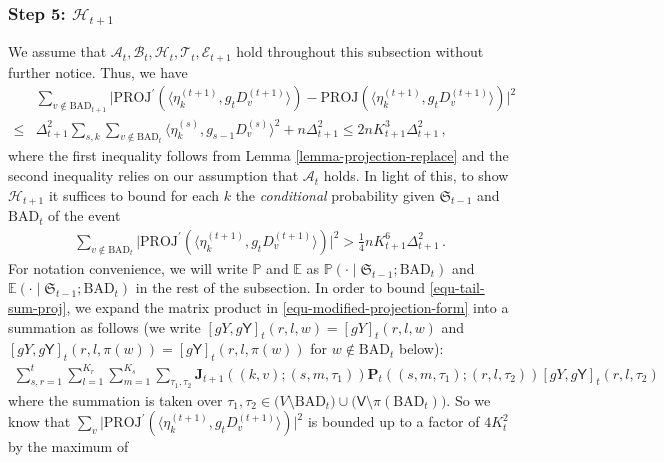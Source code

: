 \documentclass[11pt]{article}
\numberwithin{equation}{section}
\begin{document}
\subsubsection{Step 5: $\mathcal{H}_{t+1}$}
We assume that $\mathcal{A}_{t}, \mathcal{B}_{t}, \mathcal{H}_{t}, \mathcal{T}_t, \mathcal{E}_{t+1}$ hold throughout this subsection without further notice. Thus, we have
\begin{align*}
    & \sum_{v \not \in \mathrm{BAD}_{t+1}} \big| {\mathrm{PROJ}}^{\prime} (\langle \eta^{(t+1)}_k, g_t D^{(t+1)}_v \rangle) - \mathrm{PROJ}(\langle \eta^{(t+1)}_k, g_t D^{(t+1)}_v \rangle) \big|^2 \\
    \leq & \Delta_{t+1}^2 \sum_{s,k} \sum_{v \not \in \mathrm{BAD}_{t}} \langle \eta^{(s)}_k, g_{s-1} D^{(s)}_v \rangle^2 + n \Delta_{t+1}^2 \leq 2 n K_{t+1}^3 \Delta_{t+1}^2  \,,
\end{align*}
where the first inequality follows from Lemma \ref{lemma-projection-replace} and the second inequality relies on our assumption that $\mathcal{A}_t$ holds.
In light of this, to show $\mathcal{H}_{t+1}$ it suffices to bound for each $k$ the \emph{conditional} probability given $\mathfrak{S}_{t-1}$ and $\mathrm{BAD}_t$ of the event
\begin{align}
    \sum_{v \not \in \mathrm{BAD}_t} \big| {\mathrm{PROJ}}^{\prime} (\langle \eta^{(t+1)}_k, g_t D^{(t+1)}_v \rangle) \big|^2 > \frac{1}{4} n K_{t+1}^{6} \Delta_{t+1}^2\,.
    \label{equ-tail-sum-proj}
\end{align}
For notation  convenience, we will write $\mathbb P$ and $\mathbb E$ as $\mathbb P(\cdot \mid \mathfrak{S}_{t-1}; \mathrm{BAD}_t)$ and $\mathbb E(\cdot \mid \mathfrak{S}_{t-1}; \mathrm{BAD}_t)$ in the rest of the subsection. In order to bound \eqref{equ-tail-sum-proj}, we expand the matrix product in \eqref{equ-modified-projection-form} into a summation as follows (we write $[g Y,g\mathsf{Y}]_{t} (r,l,w) = [g Y]_{t} (r,l,w)$ and $[g Y,g\mathsf{Y}]_{t} (r,l,\pi(w)) = [g \mathsf{Y}]_{t} (r,l,\pi(w))$ for $w \not \in \mathrm{BAD}_t$ below):
\begin{equation}
\begin{aligned}
    \sum_{s,r=1}^{t} \sum_{l=1}^{K_r} \sum_{m=1}^{K_s} \sum_{\tau_1,\tau_2} \mathbf{J}_{t+1}( (k,v);(s,m,\tau_1) ) \mathbf{P}_t((s,m,\tau_1);(r,l,\tau_2)) [gY,g\mathsf{Y}]_{t} (r,l,\tau_2) 
    \label{equ-explicit-projection}
\end{aligned}
\end{equation}
where the summation is taken over $\tau_1, \tau_2 \in \big( V \setminus \mathrm{BAD}_t \big) \cup \big( \mathsf{V} \setminus \pi(\mathrm{BAD}_t) \big)$. So we know that $\sum_{v} \big| \mathrm{PROJ}^{\prime} (\langle \eta^{(t+1)}_k, g_t D^{(t+1)}_v \rangle) \big|^2$ is bounded up to a factor of $4K_t^2$ by the maximum of
\end{document}
